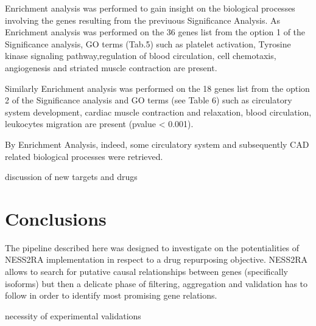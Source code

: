 \documentclass[fleqn,10pt]{SelfArx} %
\begin{document}
Enrichment analysis was performed to gain insight on the biological processes involving the genes resulting from the previuous Significance Analysis.
As Enrichment analysis was performed on the 36 genes list from the option 1 of the Significance analysis, GO terms (Tab.5) such as platelet activation, Tyrosine kinase signaling pathway,regulation of blood circulation, cell chemotaxis, angiogenesis and striated muscle contraction are present.
 
Similarly Enrichment analysis was performed on the 18 genes list from the option 2 of the Significance analysis and GO terms (see Table 6) such as circulatory system development, cardiac muscle contraction and relaxation, blood circulation, leukocytes migration are present (pvalue <  0.001).

By Enrichment Analysis, indeed, some circulatory system and subsequently CAD related biological processes were retrieved.  

discussion of new targets and drugs

\section*{Conclusions}

The pipeline described here was designed to investigate on the potentialities of NESS2RA implementation in respect to a drug repurposing objective.
NESS2RA allows to search for putative causal relationships between genes (specifically isoforms) but then a delicate phase of filtering, aggregation and validation has to follow in order to identify most promising gene relations.

necessity of experimental validations
\end{document}
